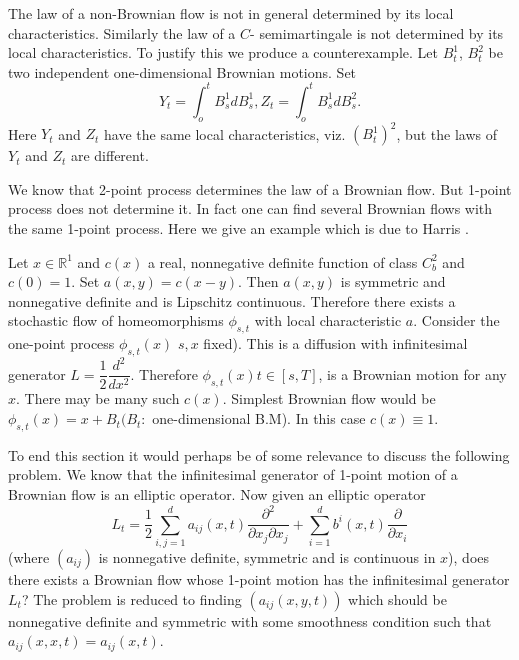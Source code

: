 \setcounter{remark}{4}
\begin{remark}\label{c2:rem2.5.5}%
  The law of a non-Brownian flow is not in general determined by its
  local characteristics. Similarly the law of a $C$- semimartingale is
  not determined by its local characteristics.  To justify this we
  produce a counterexample.  Let $B^1_t$, $B^2_t$ be two independent
  one-dimensional Brownian motions.  Set 
  $$
  Y_t = \int^t_o B^1_s dB^1_s, Z_t = \int^t_o B^1_s dB^2_s.
  $$
  Here $Y_t$ and $Z_t$ have the same local characteristics,
  viz. $(B^1_t)^2$, but the laws of $Y_t$ and $Z_t$ are different. 
\end{remark} 


\begin{remark}\label{c2:rem2.5.6}\pageoriginale%
  We know that 2-point process determines the law of a Brownian
  flow.  But 1-point process does not determine it.  In fact one can
  find several Brownian flows with the same 1-point process.  Here
  we give an example which is due to Harris \cite{9}. 
\end{remark}


\begin{example*}%
  Let $x \in \mathbb{R}^1$ and $c(x)$ a real, nonnegative
  definite function of class $C^2_b$ and $c(0) = 1$.  Set $a(x,y) =
  c(x-y)$.  Then $a(x,y)$ is symmetric and nonnegative definite and is
  Lipschitz continuous.  Therefore there exists a stochastic flow of
  homeomorphisms $\phi_{s,t}$ with local characteristic $a$.  Consider
  the one-point process $\phi_{s,t}(x)$ $s,x$ fixed). This is a
  diffusion with infinitesimal generator
  $L=\dfrac{1}{2}\dfrac{d^2}{dx^2}$. Therefore $\phi_{s,t}(x)t
  \in[s,T]$, is a Brownian motion for any $x$.  There may be
  many such $c(x)$. Simplest Brownian flow would be $\phi_{s,t}(x) =
  x+B_t (B_t: $ one-dimensional B.M). In this case $c(x) \equiv 1$. 
\end{example*}

To end this section it would perhaps be of some relevance to discuss
the following problem.  We know that the infinitesimal generator of
1-point motion of a Brownian flow is an elliptic operator.  Now
given an elliptic operator 
$$
L_t= \frac{1}{2}\sum^d_{i,j=1}a_{ij}(x,t)\frac{\partial^2}{\partial
  x_j\partial x_j}+ \sum^d_{i=1}b^i (x,t)\frac{\partial}{\partial x_i} 
$$
(where $(a_{ij})$ is nonnegative definite, symmetric and is continuous
in $x$), does there exists a Brownian flow whose 1-point motion has
the infinitesimal generator $L_t$? The problem is reduced to finding
$(a_{ij}(x,y,t))$ which should
be nonnegative definite and symmetric with some smoothness condition
such that $a_{ij}(x,x,t)=a_{ij}(x,t)$. 

